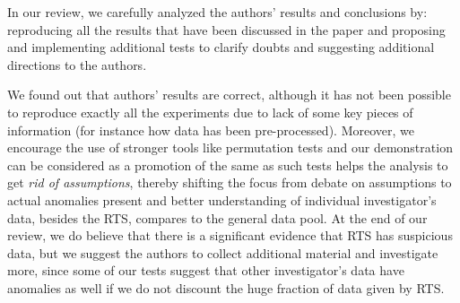\documentclass{article}
\begin{document}
In our review, we carefully analyzed the authors' results
and conclusions by: reproducing all the results that have been
discussed in the paper and proposing and implementing additional tests to
clarify doubts and suggesting additional directions to the authors.

We found out that authors' results are correct, although it has not been
possible to reproduce exactly all the experiments due to lack of some
key pieces of information (for instance how data has been
pre-processed). Moreover, we encourage the use of stronger tools like permutation tests and our demonstration can be considered as a promotion of the same as such tests helps the analysis to get \textit{rid of assumptions}, thereby shifting the focus from debate on assumptions to actual anomalies present and better understanding of individual
investigator's data, besides the RTS, compares to the general data pool.
At the end of our review, we do believe that there is a significant evidence that RTS has suspicious data, but we suggest the authors to collect additional material and investigate more, since some of our tests suggest that other investigator's
data have anomalies as well if we do not discount the huge fraction of data given by RTS.




    
\end{document}
